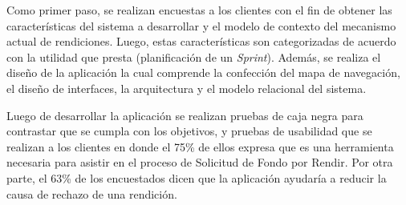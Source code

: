 \begin{resumen}

   
    Como primer paso, se realizan encuestas a los clientes con el fin de obtener las características del sistema a desarrollar y el modelo de contexto del mecanismo actual de rendiciones. Luego, estas características son categorizadas de acuerdo con la utilidad que presta (planificación de un \emph{Sprint}). Además, se realiza el diseño de la aplicación la cual comprende la confección del mapa de navegación, el diseño de interfaces, la arquitectura y el modelo relacional del sistema.

    

    Luego de desarrollar la aplicación se realizan pruebas de caja negra para contrastar que se cumpla con los objetivos, y pruebas de usabilidad que se realizan a los clientes en donde el 75\% de ellos expresa que es una herramienta necesaria para asistir en el proceso de Solicitud de Fondo por Rendir. Por otra parte, el 63\% de los encuestados dicen que la aplicación ayudaría a reducir la causa de rechazo de una rendición.

    

\end{resumen}
